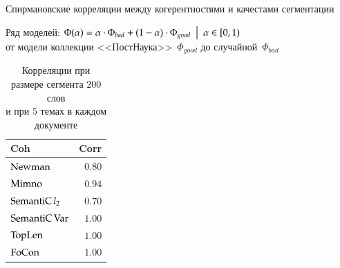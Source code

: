 \documentclass[sans, mathsans, russian]{beamer}
\begin{document}
\begin{frame}{Спирмановские корреляции между когерентностями и качестами сегментации}
  \begin{block}{}
    Ряд моделей: $\Phi(\alpha) = \alpha \cdot \Phi_{bad} + (1 - \alpha) \cdot \Phi_{good}\ \bigm|\ \alpha \in [0, 1)$\\
    от модели коллекции <<ПостНаука>>~$\Phi_{good}$ до случайной~$\Phi_{bad}$
  \end{block}
  
  \begin{table}[t]
    \begin{tabular}{lr}
      Coh & Corr\\
      \midrule
      $\operatorname{Newman}$ & $0.80$\\
      $\operatorname{Mimno}$ & $0.94$\\
      $\operatorname{SemantiC} {l_2}$ & $0.70$\\
      $\operatorname{SemantiC} {\operatorname{Var}}$ & $\mathbf{1.00}$\\
      $\operatorname{TopLen}$ & $\mathbf{1.00}$\\
      $\operatorname{FoCon}$ & $\mathbf{1.00}$\\
      \bottomrule
    \end{tabular}
    \centering
    \captionsetup{justification=centering}
    \caption*{
      Корреляции при размере сегмента $200$ %
      слов\\и при $5$ темах в каждом документе
    }
  \end{table}
\end{frame}
\end{document}
